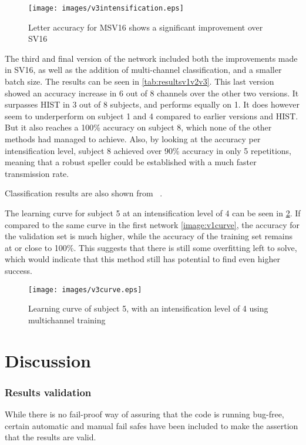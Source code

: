 \documentclass[conference]{IEEEtran}
\begin{document}
\begin{figure}[h]
  \centering
  \texttt{[image: images/v3intensification.eps]}
  \caption[MSV16 Letter accuracy]{Letter accuracy for MSV16 shows a significant improvement over SV16}
  \label{image:v3intensification}
\end{figure}

The third and final version of the network included both the improvements made in SV16, as well as the addition of multi-channel classification, and a smaller batch size. The results can be seen in \ref{tab:resultsv1v2v3}. This last version showed an accuracy increase in 6 out of 8 channels over the other two versions. It surpasses HIST in 3 out of 8 subjects, and performs equally on 1. 
It does however seem to underperform on subject 1 and 4 compared to earlier versions and HIST. But it also reaches a 100\% accuracy on subject 8, which none of the other methods had managed to achieve.
Also, by looking at the accuracy per intensification level, subject 8 achieved over 90\% accuracy in only 5 repetitions, meaning that a robust speller could be established with a much faster transmission rate. 

Classification results are also shown from ~\cite{Zhang.etal2020}.

The learning curve for subject 5 at an intensification level of 4 can be seen in \ref{image:v3curve}. If compared to the same curve in the first network \ref{image:v1curve}, the accuracy for the validation set is much higher, while the accuracy of the training set remains at or close to 100\%. This suggests that there is still some overfitting left to solve, which would indicate that this method still has potential to find even higher success.


\begin{figure}[h]
  \centering
  \texttt{[image: images/v3curve.eps]}
  \caption[MSV16 Learning curve]{Learning curve of subject 5, with an intensification level of 4 using multichannel training}
  \label{image:v3curve}
\end{figure}




\section{Discussion}


\subsubsection{Results validation}
While there is no fail-proof way of assuring that the code is running bug-free, certain automatic and manual fail safes have been included to make the assertion that the results are valid.
\end{document}
